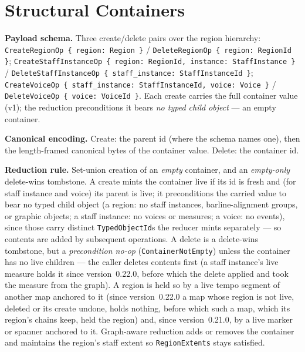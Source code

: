 \documentclass[11pt,letterpaper]{report}
\begin{document}
\section{Structural Containers}
\label{sec:k0:structural-containers}

\textbf{Payload schema.} Three create/delete pairs over the region hierarchy:
\texttt{CreateRegionOp \{ region: Region \}} /
\texttt{DeleteRegionOp \{ region: RegionId \}};
\texttt{CreateStaffInstanceOp \{ region: RegionId, instance: StaffInstance \}} /
\texttt{DeleteStaffInstanceOp \{ staff\_instance: StaffInstanceId \}};
\texttt{CreateVoiceOp \{ staff\_instance: StaffInstanceId, voice: Voice \}} /
\texttt{DeleteVoiceOp \{ voice: VoiceId \}}. Each create carries the full
container value (v1); the reduction preconditions it bears \emph{no typed child
object} --- an empty container.

\textbf{Canonical encoding.} Create: the parent id (where the schema names one),
then the length-framed canonical bytes of the container value. Delete: the
container id.

\textbf{Reduction rule.} Set-union creation of an \emph{empty} container, and an
\emph{empty-only} delete-wins tombstone. A create mints the container live if its
id is fresh and (for staff instance and voice) its parent is live; it
preconditions the carried value to bear no typed child object (a region: no staff
instances, barline-alignment groups, or graphic objects; a staff instance: no
voices or measures; a voice: no events), since those carry distinct
\texttt{TypedObjectId}s the reducer mints separately --- so contents are added by
subsequent operations. A delete is a delete-wins tombstone, but a
\emph{precondition no-op} (\texttt{ContainerNotEmpty}) unless the container has no
live children --- the caller deletes contents first (a staff instance's live
measure holds it since version~0.22.0, before which the delete applied and took
the measure from the graph). A region is held so by a
live tempo segment of another map anchored to it (since version~0.22.0 a map
whose region is not live, deleted or its create undone, holds nothing, before
which such a map, which its region's chains keep, held the region) and, since
version~0.21.0, by a live marker or spanner anchored to it. Graph-aware reduction adds
or removes the container and maintains the region's staff extent so
\texttt{RegionExtents} stays satisfied.
\end{document}
